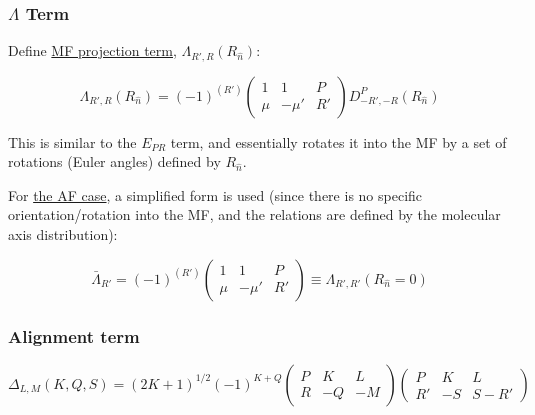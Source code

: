 \subsubsection{\texorpdfstring{\(\Lambda\)
Term}{\textbackslash{}Lambda Term}}\label{lambda-term}

Define
\href{https://epsproc.readthedocs.io/en/latest/methods/geometric_method_dev_260220_090420_tidy.html\#/Lambda-Term}{MF
projection term}, \(\Lambda_{R',R}(R_{\hat{n}})\):

\begin{equation}
\Lambda_{R',R}(R_{\hat{n}})=(-1)^{(R')}\left(\begin{array}{ccc}
1 & 1 & P\\
\mu & -\mu' & R'
\end{array}\right)D_{-R',-R}^{P}(R_{\hat{n}})
\end{equation}

This is similar to the \(E_{PR}\) term, and essentially rotates it into
the MF by a set of rotations (Euler angles) defined by \(R_{\hat{n}}\).

For
\href{https://epsproc.readthedocs.io/en/latest/methods/geometric_method_dev_pt3_AFBLM_090620_010920_dev_bk100920.html\#/beta_\%7BL,M\%7D\%5E\%7BAF\%7D-rewrite}{the
AF case}, a simplified form is used (since there is no specific
orientation/rotation into the MF, and the relations are defined by the
molecular axis distribution):

\begin{equation}
\bar{\Lambda}_{R'}=(-1)^{(R')}\left(\begin{array}{ccc}
1 & 1 & P\\
\mu & -\mu' & R'
\end{array}\right)\equiv\Lambda_{R',R'}(R_{\hat{n}}=0)
\end{equation}

\subsubsection{Alignment term}\label{alignment-term}

\begin{equation}
\Delta_{L,M}(K,Q,S)=(2K+1)^{1/2}(-1)^{K+Q}\left(\begin{array}{ccc}
P & K & L\\
R & -Q & -M
\end{array}\right)\left(\begin{array}{ccc}
P & K & L\\
R' & -S & S-R'
\end{array}\right)
\end{equation}

